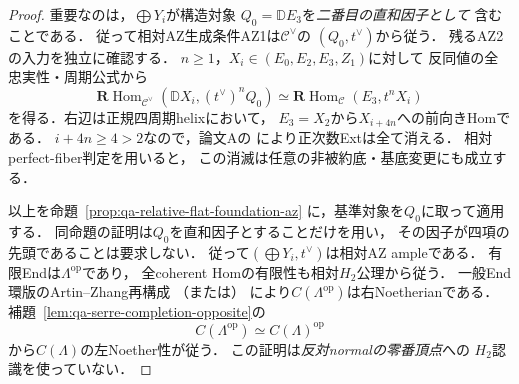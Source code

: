 \begin{proof}
重要なのは，$\bigoplus Y_i$が構造対象
$Q_0=\mathbb DE_3$を\emph{二番目の直和因子として}
含むことである．
従って相対AZ生成条件AZ1は$\mathcal C^\vee$の
$(Q_0,t^\vee)$から従う．
残るAZ2の入力を独立に確認する．
$n\ge1$，$X_i\in(E_0,E_2,E_3,Z_1)$に対して
反同値の全忠実性・周期公式から
\[
 \mathbf R\operatorname{Hom}_{\mathcal C^\vee}
   (\mathbb DX_i,(t^\vee)^nQ_0)
 \simeq
 \mathbf R\operatorname{Hom}_{\mathcal C}
   (E_3,t^nX_i)
 \tag{OD}\label{eq:qa-q12-dual-normal-forward-ext}
\]
を得る．右辺は正規四周期helixにおいて，
$E_3=X_2$から$X_{i+4n}$への前向きHomである．
$i+4n\ge4>2$なので，論文Aの
\cite[\texttt{thm:normal-helix}]{QuadricIntrinsic2026}
により正次数Extは全て消える．
相対perfect-fiber判定を用いると，
この消滅は任意の非被約底・基底変更にも成立する．

以上を命題~\ref{prop:qa-relative-flat-foundation-az}
に，基準対象を$Q_0$に取って適用する．
同命題の証明は$Q_0$を直和因子とすることだけを用い，
その因子が四項の先頭であることは要求しない．
従って$(\bigoplus Y_i,t^\vee)$は相対AZ ampleである．
有限Endは$\Lambda^{\mathrm{op}}$であり，
全coherent Homの有限性も相対$H_2$公理から従う．
一般End環版のArtin--Zhang再構成
\cite[Theorem 4.5(1)]{AZ1994}
（または\cite[Theorem 7.3]{OACU2026}）
により$C(\Lambda^{\mathrm{op}})$は右Noetherianである．
補題~\ref{lem:qa-serre-completion-opposite}の
\[
 C(\Lambda^{\mathrm{op}})\simeq C(\Lambda)^{\mathrm{op}}
\]
から$C(\Lambda)$の左Noether性が従う．
この証明は\emph{反対normalの零番頂点}への
$H_2$認識を使っていない．
\end{proof}

